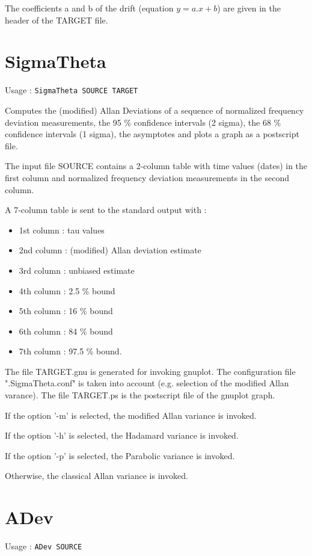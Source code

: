 \documentclass[12pt,a4paper,french]{article}
\begin{document}
The coefficients a and b of the drift (equation $y=a.x+b$) are given in the header of the TARGET file.

\section{SigmaTheta}

Usage : {\tt{SigmaTheta SOURCE TARGET}}

Computes the (modified) Allan Deviations of a sequence of normalized frequency deviation measurements, the 95 \% confidence intervals (2 sigma), the 68 \% confidence intervals (1 sigma), the asymptotes and plots a graph as a postscript file.

The input file SOURCE contains a 2-column table with time values (dates) in the first column and normalized frequency deviation measurements in the second column.

A 7-column table is sent to the standard output with :
\begin{itemize}
\item   1st column : tau values
\item   2nd column : (modified) Allan deviation estimate
\item   3rd column : unbiased estimate
\item   4th column : 2.5 \% bound
\item   5th column : 16 \% bound
\item   6th column : 84 \% bound
\item   7th column : 97.5 \% bound.
\end{itemize}

The file TARGET.gnu is generated for invoking gnuplot. The configuration file ".SigmaTheta.conf" is taken into account (e.g. selection of the modified Allan varance).
The file TARGET.ps is the postscript file of the gnuplot graph.

If the option ’-m’ is selected, the modified Allan variance is invoked.

If the option ’-h’ is selected, the Hadamard variance is invoked.

If the option ’-p’ is selected, the Parabolic variance is invoked.

Otherwise, the classical Allan variance is invoked.

\section{ADev}

Usage : {\tt{ADev SOURCE}}
\end{document}
